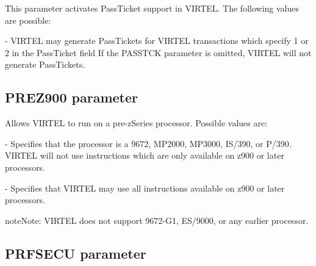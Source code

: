 \documentclass[letterpaper,10pt,english]{sphinxmanual}
\begin{document}
This parameter activates PassTicket support in VIRTEL. The following values are possible:

 - VIRTEL may generate PassTickets for VIRTEL transactions which specify 1 or 2 in the PassTicket field If the PASSTCK parameter is omitted, VIRTEL will not generate PassTickets.


\subsection{PREZ900 parameter}
\label{\detokenize{Installation_Guide:index-100}}\label{\detokenize{Installation_Guide:prez900-parameter}}
\begin{sphinxVerbatim}[commandchars=\\\{\}]
 
\end{sphinxVerbatim}

Allows VIRTEL to run on a pre-zSeries processor. Possible values are:

 - Specifies that the processor is a 9672, MP2000, MP3000, IS/390, or P/390. VIRTEL will not use instructions which are only available on z900 or later processors.

 - Specifies that VIRTEL may use all instructions available on z900 or later processors.

\begin{sphinxadmonition}{note}{Note:}
VIRTEL does not support 9672-G1, ES/9000, or any earlier processor.
\end{sphinxadmonition}


\subsection{PRFSECU parameter}
\label{\detokenize{Installation_Guide:index-101}}\label{\detokenize{Installation_Guide:prfsecu-parameter}}
\begin{sphinxVerbatim}[commandchars=\\\{\}]
 
\end{sphinxVerbatim}
\end{document}

